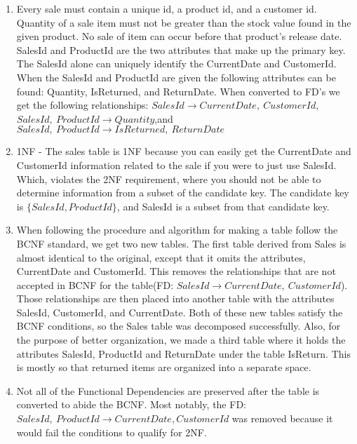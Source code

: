 \documentclass{article}
\begin{document}
  \begin{enumerate}[label=\roman*]
  	\item Every sale must contain a unique id, a product id, and a customer id. Quantity of a sale item must not be greater than the stock value found in the given product. No sale of item can occur before that product's release date. SalesId and
  	ProductId are the two attributes that make up the primary key. The SalesId alone can
  	uniquely identify the CurrentDate and CustomerId. When the SalesId and ProductId are 
  	given the following attributes can be found: Quantity, IsReturned, and ReturnDate.
  	 When converted to FD's we get the following relationships:
    $SalesId\rightarrow CurrentDate,\ CustomerId$, $SalesId,\ ProductId\rightarrow
    Quantity$,\newline and 
    $SalesId,\ ProductId\rightarrow IsReturned,\ ReturnDate$
  	\item 1NF - The sales table is 1NF because you can easily get the CurrentDate and CustomerId information related to the sale if you were to just use SalesId. Which, violates the 2NF requirement, where you should not be able to determine information from a subset of the candidate key. The candidate key is $\{SalesId,ProductId\}$, and SalesId is a subset from that candidate key.
  	\item When following the procedure and algorithm for making a table follow the BCNF
  	standard, we get two new tables. The first table derived from Sales is almost 
  	identical to the original, except that it omits the attributes, CurrentDate and 
  	CustomerId. This removes the relationships that are not accepted in BCNF for the
  	table\newline (FD: $SalesId\rightarrow CurrentDate,\ CustomerId$). Those relationships are
  	then placed into another table with the attributes SalesId, CustomerId, and 
  	CurrentDate. Both of these new tables satisfy the BCNF conditions, so the Sales
  	table was decomposed successfully. Also, for the purpose of better organization, we 
  	made a third table where it holds the attributes SalesId, ProductId and ReturnDate under 
  	the table IsReturn. This is mostly so that returned items are organized into a separate space.
  	\item Not all of the Functional Dependencies are preserved after the table is 
  	converted to abide the BCNF. Most notably, the FD:
  	$SalesId,\ ProductId\rightarrow CurrentDate, CustomerId$ was removed because it would
  	fail the conditions to qualify for 2NF. 
  \end{enumerate}
\end{document}
